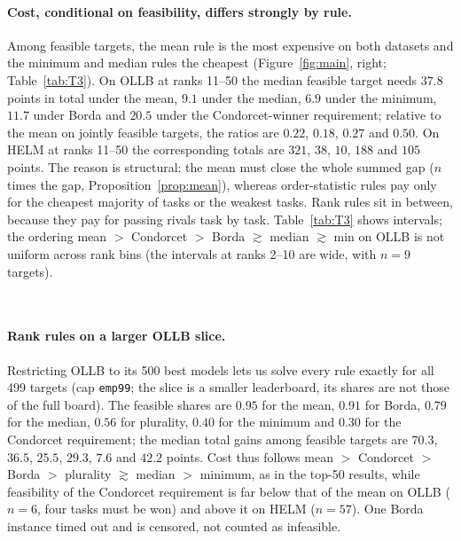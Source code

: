\documentclass{article}
\begin{document}
\paragraph{Cost, conditional on feasibility, differs strongly by rule.}
Among feasible targets, the mean rule is the most expensive on both datasets and the minimum and median rules the cheapest (Figure~\ref{fig:main}, right; Table~\ref{tab:T3}). On OLLB at ranks 11--50 the median feasible target needs $37.8$ points in total under the mean, $9.1$ under the median, $6.9$ under the minimum, $11.7$ under Borda and $20.5$ under the Condorcet-winner requirement; relative to the mean on jointly feasible targets, the ratios are $0.22$, $0.18$, $0.27$ and $0.50$. On HELM at ranks 11--50 the corresponding totals are $321$, $38$, $10$, $188$ and $105$ points. The reason is structural: the mean must close the whole summed gap ($n$ times the gap, Proposition~\ref{prop:mean}), whereas order-statistic rules pay only for the cheapest majority of tasks or the weakest tasks. Rank rules sit in between, because they pay for passing rivals task by task. Table~\ref{tab:T3} shows intervals; the ordering mean $>$ Condorcet $>$ Borda $\gtrsim$ median $\gtrsim$ min on OLLB is not uniform across rank bins (the intervals at ranks 2--10 are wide, with $n=9$ targets).

\begin{table}[t]
\caption{Median investment to become first among feasible targets, by rank stratum and rule, primary caps: OLLB (\texttt{emp99}, top) and HELM (\texttt{emp99T}, bottom). ``feas.'' = feasible targets / targets in the stratum; $K$, $L_1$ with 95\% bootstrap intervals over targets; the last column is the median ratio of $L_1$ to the mean rule over targets feasible under both. OLLB Borda and Condorcet use the 50 best targets only. Generated by \texttt{figures/src/tables.py}.}
\label{tab:T3}
\centering\scriptsize
\resizebox{\linewidth}{!}{}\\[4pt]
\resizebox{\linewidth}{!}{}
\end{table}

\paragraph{Rank rules on a larger OLLB slice.}
Restricting OLLB to its 500 best models lets us solve every rule exactly for all 499 targets (cap \texttt{emp99}; the slice is a smaller leaderboard, its shares are not those of the full board). The feasible shares are $0.95$ for the mean, $0.91$ for Borda, $0.79$ for the median, $0.56$ for plurality, $0.40$ for the minimum and $0.30$ for the Condorcet requirement; the median total gains among feasible targets are $70.3$, $36.5$, $25.5$, $29.3$, $7.6$ and $42.2$ points. Cost thus follows mean $>$ Condorcet $>$ Borda $>$ plurality $\gtrsim$ median $>$ minimum, as in the top-50 results, while feasibility of the Condorcet requirement is far below that of the mean on OLLB ($n=6$, four tasks must be won) and above it on HELM ($n=57$). One Borda instance timed out and is censored, not counted as infeasible.
\end{document}
